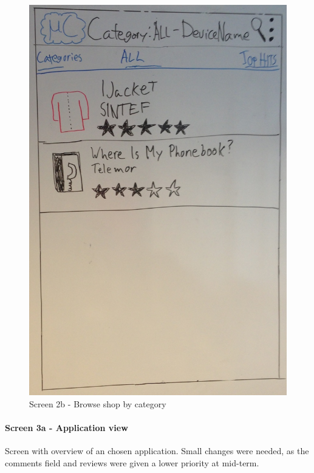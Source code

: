 \begin{figure}[H]
\centering
\includegraphics[scale=0.2]{images/Design_guide/Screen2b.png}
\caption{Screen 2b - Browse shop by category}
\end{figure}


\paragraph{Screen 3a - Application view}
Screen with overview of an chosen application. Small changes were needed, as the comments field and reviews were given a lower priority at mid-term.

